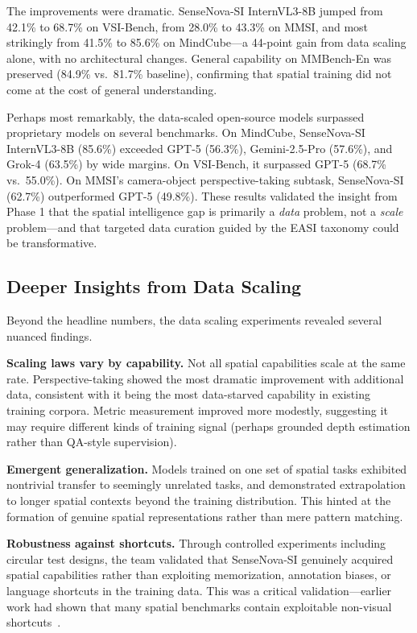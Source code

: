 \documentclass[
hf,
]{confart}
\begin{document}
The improvements were dramatic. SenseNova-SI InternVL3-8B jumped from 42.1\% to 68.7\% on VSI-Bench, from 28.0\% to 43.3\% on MMSI, and most strikingly from 41.5\% to 85.6\% on MindCube---a 44-point gain from data scaling alone, with no architectural changes. General capability on MMBench-En was preserved (84.9\% vs.\ 81.7\% baseline), confirming that spatial training did not come at the cost of general understanding.

Perhaps most remarkably, the data-scaled open-source models surpassed proprietary models on several benchmarks. On MindCube, SenseNova-SI InternVL3-8B (85.6\%) exceeded GPT-5 (56.3\%), Gemini-2.5-Pro (57.6\%), and Grok-4 (63.5\%) by wide margins. On VSI-Bench, it surpassed GPT-5 (68.7\% vs.\ 55.0\%). On MMSI's camera-object perspective-taking subtask, SenseNova-SI (62.7\%) outperformed GPT-5 (49.8\%). These results validated the insight from Phase 1 that the spatial intelligence gap is primarily a \textit{data} problem, not a \textit{scale} problem---and that targeted data curation guided by the EASI taxonomy could be transformative.

\subsection{Deeper Insights from Data Scaling}

Beyond the headline numbers, the data scaling experiments revealed several nuanced findings.

\textbf{Scaling laws vary by capability.} Not all spatial capabilities scale at the same rate. Perspective-taking showed the most dramatic improvement with additional data, consistent with it being the most data-starved capability in existing training corpora. Metric measurement improved more modestly, suggesting it may require different kinds of training signal (perhaps grounded depth estimation rather than QA-style supervision).

\textbf{Emergent generalization.} Models trained on one set of spatial tasks exhibited nontrivial transfer to seemingly unrelated tasks, and demonstrated extrapolation to longer spatial contexts beyond the training distribution. This hinted at the formation of genuine spatial representations rather than mere pattern matching.

\textbf{Robustness against shortcuts.} Through controlled experiments including circular test designs, the team validated that SenseNova-SI genuinely acquired spatial capabilities rather than exploiting memorization, annotation biases, or language shortcuts in the training data. This was a critical validation---earlier work had shown that many spatial benchmarks contain exploitable non-visual shortcuts~\cite{brown2025benchmarkdesignerstraintest}.
\end{document}
